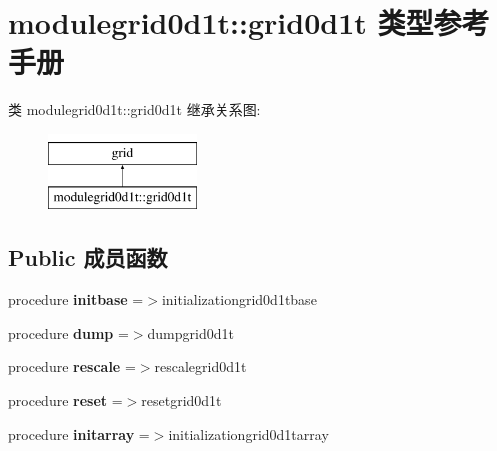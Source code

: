 \hypertarget{structmodulegrid0d1t_1_1grid0d1t}{}\section{modulegrid0d1t\+::grid0d1t 类型参考手册}
\label{structmodulegrid0d1t_1_1grid0d1t}
类 modulegrid0d1t\+::grid0d1t 继承关系图\+:\begin{figure}[H]
\begin{center}
\leavevmode
\includegraphics[height=2.000000cm]{structmodulegrid0d1t_1_1grid0d1t}
\end{center}
\end{figure}
\subsection*{Public 成员函数}
\begin{DoxyCompactItemize}
\item 
\mbox{\label{structmodulegrid0d1t_1_1grid0d1t_a5e0e71545e257449699334d192a06b6b}} 
procedure {\bfseries initbase} =$>$initializationgrid0d1tbase
\item 
\mbox{\label{structmodulegrid0d1t_1_1grid0d1t_a3b1bb3b6dfa47156f6977cf127635991}} 
procedure {\bfseries dump} =$>$dumpgrid0d1t
\item 
\mbox{\label{structmodulegrid0d1t_1_1grid0d1t_a34512870f0f1fad279b681ab3b347b05}} 
procedure {\bfseries rescale} =$>$rescalegrid0d1t
\item 
\mbox{\label{structmodulegrid0d1t_1_1grid0d1t_a08dc0ba56c8c45e9c11417b49d73a257}} 
procedure {\bfseries reset} =$>$resetgrid0d1t
\item 
\mbox{\label{structmodulegrid0d1t_1_1grid0d1t_ad69c9ef66ba52a846b141c4b44f74817}} 
procedure {\bfseries initarray} =$>$initializationgrid0d1tarray
\end{DoxyCompactItemize}
